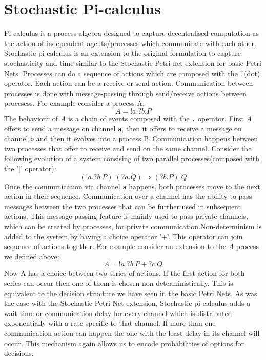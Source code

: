 \section{Stochastic Pi-calculus}
Pi-calculus is a process algebra designed to capture decentralised
computation as the action of independent agents/processes which
communicate with each other. Stochastic pi-calculus is an extension to
the original formulation to capture stochasticity and time similar to
the Stochastic Petri net extension for basic Petri Nets. Processes can
do a sequence of actions which are composed with the '.'(dot)
operator. Each action can be a receive or send 
action. Communication between processes is done with
message-passing through send/receive actions between procesess. For
example consider a process A:
\begin{equation*}
A = !a.?b.P
\end{equation*}
The behaviour of $A$ is a chain of events composed with the
\texttt{.} operator. First $A$ offers to send a message on channel
\texttt{a}, then it offers to receive a message on channel \texttt{b}
and then it evolves into a process P. Communication happens between two
processes that offer to receive and send on the same channel. Consider
the following evolution of a system consising of two parallel processes(composed
with the '|' operator):
\begin{equation*}
(!a.?b.P) | (?a.Q) \Rightarrow (?b.P) | Q
\end{equation*}
Once the communication via channel \texttt{a} happens, both processes
move to the next action in their sequence. Communication over a
channel has the ability to pass messages between the two processes
that can be further used in subsequent actions. This message passing
feature is mainly used to pass private channels, which can be created
by processes, for private communication.Non-determinism is added to
the system by having a choice operator '+'. This operator can join
sequence of actions together. For example consider an extension to the
$A$ process we defined above:
\begin{equation*}
A = !a.?b.P + ?c.Q
\end{equation*}
Now A has a choice between two series of actions. If the first action
for both series can occur then one of them is chosen
non-deterministically. This is equivalent to the decision structure we
have seen in the basic Petri Nets. As was the case with the Stochastic
Petri Net extension, Stochastic pi-calculus adds a wait time or
communication delay for every channel which is distributed
exponentially with a rate specific to that channel. If more than one
communication action can happen the one with the least delay in its
channel will occur. This mechanism again allows us to encode
probabilities of options for decisions.

